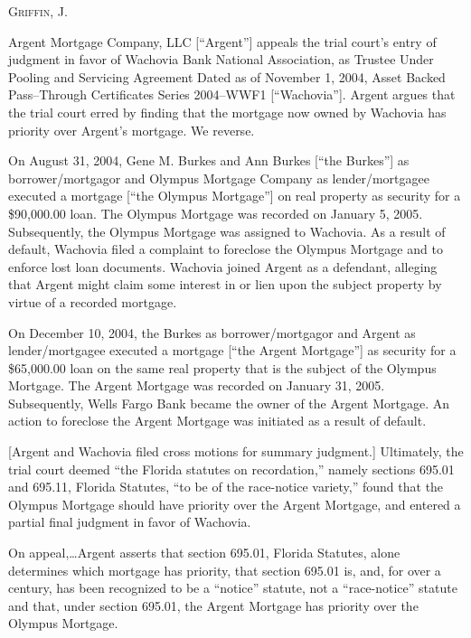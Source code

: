 
\textsc{Griffin}, J.

Argent Mortgage Company, LLC [``Argent''] appeals the trial court's entry of
judgment in favor of Wachovia Bank National Association, as Trustee Under
Pooling and Servicing Agreement Dated as of November 1, 2004, Asset Backed
Pass--Through Certificates Series 2004--WWF1 [``Wachovia'']. Argent argues that
the trial court erred by finding that the mortgage now owned by Wachovia has
priority over Argent's mortgage. We reverse.

On August 31, 2004, Gene M. Burkes and Ann Burkes [``the Burkes''] as
borrower/mortgagor and Olympus Mortgage Company as lender/mortgagee executed a
mortgage [``the Olympus Mortgage''] on real property as security for a
\$90,000.00 loan. The Olympus Mortgage was recorded on January 5, 2005.
Subsequently, the Olympus Mortgage was assigned to Wachovia. As a result of
default, Wachovia filed a complaint to foreclose the Olympus Mortgage and to
enforce lost loan documents. Wachovia joined Argent as a defendant, alleging
that Argent might claim some interest in or lien upon the subject property by
virtue of a recorded mortgage.

On December 10, 2004, the Burkes as borrower/mortgagor and Argent as
lender/mortgagee executed a mortgage [``the Argent Mortgage''] as security for
a \$65,000.00 loan on the same real property that is the subject of the Olympus
Mortgage. The Argent Mortgage was recorded on January 31, 2005. Subsequently,
Wells Fargo Bank became the owner of the Argent Mortgage. An action to
foreclose the Argent Mortgage was initiated as a result of default.

[Argent and Wachovia filed cross motions for summary judgment.] Ultimately, the
trial court deemed ``the Florida statutes on recordation,'' namely sections
695.01 and 695.11, Florida Statutes, ``to be of the race-notice variety,''
found that the Olympus Mortgage should have priority over the Argent Mortgage,
and entered a partial final judgment in favor of Wachovia.

On appeal,\ldots Argent asserts that section 695.01, Florida Statutes, alone
determines which mortgage has priority, that section 695.01 is, and, for over a
century, has been recognized to be a ``notice'' statute, not a ``race-notice''
statute and that, under section 695.01, the Argent Mortgage has priority over
the Olympus Mortgage.

